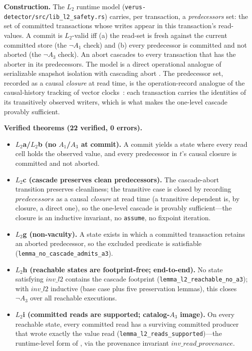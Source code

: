 \documentclass[journal,compsoc,10pt]{IEEEtran}
\providecommand{\citep}{\cite}
\theoremstyle{definition}
\theoremstyle{remark}
\begin{document}
\medskip
\noindent\textbf{Construction.}
The $L_2$ runtime model
(\texttt{verus-detector/src/lib\_l2\_safety.rs}) carries, per
transaction, a \emph{predecessors} set: the set of committed
transactions whose writes appear in this transaction's
read-values. A commit is $L_2$-valid iff (a) the read-set is
fresh against the current committed store (the $\neg A_1$
check) and (b) every predecessor is committed and not aborted
(the $\neg A_3$ check). An abort cascades to every transaction
that has the aborter in its predecessors. The model is a
direct operational analogue of serializable snapshot
isolation with cascading abort \citep{CahillRohmFekete2008SSI}. The
predecessor set, recorded as a causal \emph{closure} at read time, is
the operation-record analogue of the causal-history tracking of
vector clocks~\citep{Fidge1988Timestamps,Mattern1989VirtualTime}:
each transaction carries the identities of its transitively observed
writers, which is what makes the one-level cascade provably
sufficient.

\medskip
\noindent\textbf{Verified theorems (22 verified, 0 errors).}
\begin{itemize}
  \item \textbf{$L_2$a/$L_2$b (no $A_1$/$A_3$ at commit).} A commit yields
    a state where every read cell holds the observed value, and every
    predecessor in $t$'s causal closure is committed and not aborted.
  \item \textbf{$L_2$c (cascade preserves clean predecessors).} The
    cascade-abort transition preserves cleanliness; the transitive case is
    closed by recording $\mathit{predecessors}$ as a causal \emph{closure}
    at read time (a transitive dependent is, by closure, a direct one), so
    the one-level cascade is provably sufficient---the closure is an
    inductive invariant, no \texttt{assume}, no fixpoint iteration.
  \item \textbf{$L_2$g (non-vacuity).} A state exists in which a committed
    transaction retains an aborted predecessor, so the excluded predicate
    is satisfiable (\texttt{lemma\_no\_cascade\_admits\_a3}).
  \item \textbf{$L_2$h (reachable states are footprint-free; end-to-end).}
    No state satisfying $\mathit{inv\_l2}$ contains the cascade footprint
    (\texttt{lemma\_l2\_reachable\_no\_a3}); with $\mathit{inv\_l2}$
    inductive (base case plus five preservation lemmas), this closes
    $\neg A_3$ over all reachable executions.
  \item \textbf{$L_2$i (committed reads are supported; catalog-$A_3$
    image).} On every reachable state, every committed read has a
    surviving committed producer that wrote exactly the value read
    (\texttt{lemma\_l2\_reads\_supported})---the runtime-level form of
    , via the provenance invariant $\mathit{inv\_read\_provenance}$.
\end{itemize}
\end{document}
